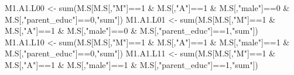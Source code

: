 \documentclass[
]{book}
\newenvironment{Shaded}{\begin{snugshade}}{\end{snugshade}}
\newcommand{\DecValTok}[1]{\textcolor[rgb]{0.00,0.00,0.81}{#1}}
\newcommand{\FunctionTok}[1]{\textcolor[rgb]{0.00,0.00,0.00}{#1}}
\newcommand{\NormalTok}[1]{#1}
\newcommand{\OtherTok}[1]{\textcolor[rgb]{0.56,0.35,0.01}{#1}}
\newcommand{\SpecialCharTok}[1]{\textcolor[rgb]{0.00,0.00,0.00}{#1}}
\newcommand{\StringTok}[1]{\textcolor[rgb]{0.31,0.60,0.02}{#1}}
\begin{document}
\begin{Shaded}
\begin{Highlighting}[]
\NormalTok{  M1.A1.L00 }\OtherTok{\textless{}{-}} \FunctionTok{sum}\NormalTok{(M.S[M.S[,}\StringTok{"M"}\NormalTok{]}\SpecialCharTok{==}\DecValTok{1} \SpecialCharTok{\&}\NormalTok{ M.S[,}\StringTok{"A"}\NormalTok{]}\SpecialCharTok{==}\DecValTok{1} \SpecialCharTok{\&}\NormalTok{ M.S[,}\StringTok{"male"}\NormalTok{]}\SpecialCharTok{==}\DecValTok{0} \SpecialCharTok{\&} 
\NormalTok{                         M.S[,}\StringTok{"parent\_educ"}\NormalTok{]}\SpecialCharTok{==}\DecValTok{0}\NormalTok{,}\StringTok{"sum"}\NormalTok{])}
\NormalTok{  M1.A1.L01 }\OtherTok{\textless{}{-}} \FunctionTok{sum}\NormalTok{(M.S[M.S[,}\StringTok{"M"}\NormalTok{]}\SpecialCharTok{==}\DecValTok{1} \SpecialCharTok{\&}\NormalTok{ M.S[,}\StringTok{"A"}\NormalTok{]}\SpecialCharTok{==}\DecValTok{1} \SpecialCharTok{\&}\NormalTok{ M.S[,}\StringTok{"male"}\NormalTok{]}\SpecialCharTok{==}\DecValTok{0} \SpecialCharTok{\&} 
\NormalTok{                         M.S[,}\StringTok{"parent\_educ"}\NormalTok{]}\SpecialCharTok{==}\DecValTok{1}\NormalTok{,}\StringTok{"sum"}\NormalTok{])}
\NormalTok{  M1.A1.L10 }\OtherTok{\textless{}{-}} \FunctionTok{sum}\NormalTok{(M.S[M.S[,}\StringTok{"M"}\NormalTok{]}\SpecialCharTok{==}\DecValTok{1} \SpecialCharTok{\&}\NormalTok{ M.S[,}\StringTok{"A"}\NormalTok{]}\SpecialCharTok{==}\DecValTok{1} \SpecialCharTok{\&}\NormalTok{ M.S[,}\StringTok{"male"}\NormalTok{]}\SpecialCharTok{==}\DecValTok{1} \SpecialCharTok{\&} 
\NormalTok{                         M.S[,}\StringTok{"parent\_educ"}\NormalTok{]}\SpecialCharTok{==}\DecValTok{0}\NormalTok{,}\StringTok{"sum"}\NormalTok{])}
\NormalTok{  M1.A1.L11 }\OtherTok{\textless{}{-}} \FunctionTok{sum}\NormalTok{(M.S[M.S[,}\StringTok{"M"}\NormalTok{]}\SpecialCharTok{==}\DecValTok{1} \SpecialCharTok{\&}\NormalTok{ M.S[,}\StringTok{"A"}\NormalTok{]}\SpecialCharTok{==}\DecValTok{1} \SpecialCharTok{\&}\NormalTok{ M.S[,}\StringTok{"male"}\NormalTok{]}\SpecialCharTok{==}\DecValTok{1} \SpecialCharTok{\&} 
\NormalTok{                         M.S[,}\StringTok{"parent\_educ"}\NormalTok{]}\SpecialCharTok{==}\DecValTok{1}\NormalTok{,}\StringTok{"sum"}\NormalTok{])}
  

\end{Highlighting}
\end{Shaded}
\end{document}
